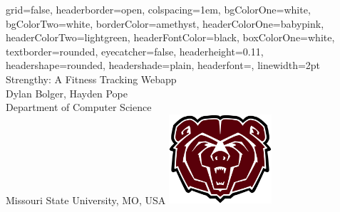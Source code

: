 \documentclass[a0paper,portrait]{baposter}
\begin{document}
\begin{poster}
{
grid=false,
headerborder=open, %
colspacing=1em, %
bgColorOne=white, %
bgColorTwo=white, %
borderColor=amethyst, %
headerColorOne=babypink, %
headerColorTwo=lightgreen, %
headerFontColor=black, %
boxColorOne=white, %
textborder=rounded, %
eyecatcher=false, %
headerheight=0.11\textheight, %
headershape=rounded, %
headershade=plain,
headerfont=\Large\textsf, %
linewidth=2pt %
}
{}
%
%
{
\textsf %
{{\color{red} Strengthy: A Fitness Tracking Webapp}
}
} %
%
%
{\sf\\
Dylan Bolger, Hayden Pope
\vspace{0.1em}\\
\large{Department of Computer Science\\
Missouri State University, MO, USA}}
{\includegraphics[width=38mm]{img/Missouri_State_logo.png}}


\end{poster}
\end{document}
